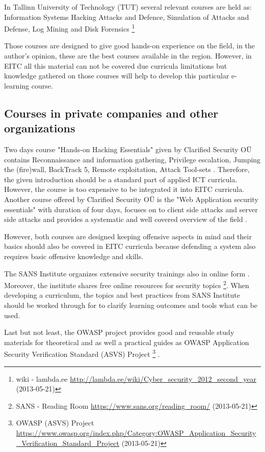 In Tallinn University of Technology (\gls{TUT}) several relevant courses are held as: Information Systems Hacking Attacks and Defence, Simulation of Attacks and Defense, Log Mining and Disk Forensics \footnote{wiki - lambda.ee \url{http://lambda.ee/wiki/Cyber_security_2012_second_year} (2013-05-21)}

Those courses are designed to give good hands-on experience on the field, in the author’s opinion, these are the best courses available in the region. However, in \gls{EITC} all this material can not be covered due curricula limitations but knowledge gathered on those courses will help to develop this particular e-learning course.

\subsection{Courses in private companies and other organizations}

Two days course "Hands-on Hacking Essentials" given by Clarified Security OÜ contains Reconnaissance and information gathering, Privilege escalation, Jumping the (fire)wall, BackTrack 5, Remote exploitation, Attack Tool-sets \citep{website:clarifiedsecurity_hohe}. Therefore, the given introduction should be a standard part of applied \gls{ICT} curricula. However, the course is too expensive to be integrated it into \gls{EITC} curricula. Another course offered by Clarified Security OÜ is the "Web Application security essentials" with duration of four days, focuses on to client side attacks and server side attacks and provides a systematic and well covered overview of the field \citep{website:clarifiedsecurity_hohe}.

However, both courses are designed  keeping offensive aspects in mind and their basics should also be covered in \gls{EITC} curricula because defending a system also requires basic offensive knowledge and skills.


The SANS Institute organizes extensive security trainings also in online form \citep{website:SANS}. Moreover, the institute shares free online resources for security topics \footnote{SANS - Reading Room \url{https://www.sans.org/reading_room/} (2013-05-21)}. When developing a curriculum, the topics and best practices from SANS Institute should be worked through for to clarify learning outcomes and tools what can be used.

Last but not least, the \gls{OWASP} project provides good and reusable study materials  for theoretical and as well a practical guides as \gls{OWASP} Application Security Verification Standard (\gls{ASVS}) Project \footnote{\gls{OWASP}  (\gls{ASVS}) Project \url{https://www.owasp.org/index.php/Category:OWASP_Application_Security_Verification_Standard_Project} (2013-05-21)} .

